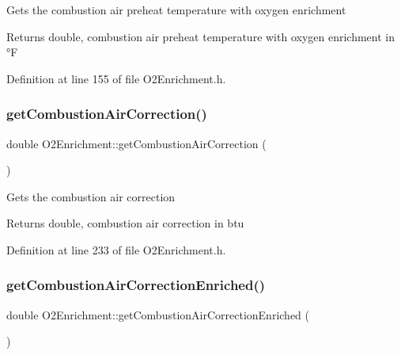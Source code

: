 Gets the combustion air preheat temperature with oxygen enrichment \begin{DoxyReturn}{Returns}
double, combustion air preheat temperature with oxygen enrichment in °F 
\end{DoxyReturn}


Definition at line 155 of file O2\+Enrichment.\+h.

\mbox{\label{class_o2_enrichment_a7ecca6a53529843246555ae33379d464}} 
\subsubsection{\texorpdfstring{get\+Combustion\+Air\+Correction()}{getCombustionAirCorrection()}}
{\footnotesize\ttfamily double O2\+Enrichment\+::get\+Combustion\+Air\+Correction (\begin{DoxyParamCaption}{ }\end{DoxyParamCaption})\hspace{0.3cm}{\ttfamily [inline]}}

Gets the combustion air correction \begin{DoxyReturn}{Returns}
double, combustion air correction in btu 
\end{DoxyReturn}


Definition at line 233 of file O2\+Enrichment.\+h.

\mbox{\label{class_o2_enrichment_aa8bbec67d760c83da77ce5b4ee01e41c}} 
\subsubsection{\texorpdfstring{get\+Combustion\+Air\+Correction\+Enriched()}{getCombustionAirCorrectionEnriched()}}
{\footnotesize\ttfamily double O2\+Enrichment\+::get\+Combustion\+Air\+Correction\+Enriched (\begin{DoxyParamCaption}{ }\end{DoxyParamCaption})\hspace{0.3cm}{\ttfamily [inline]}}

